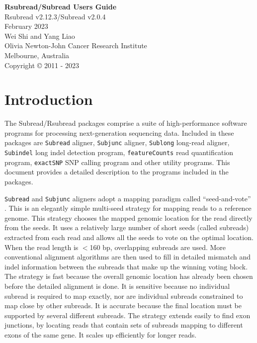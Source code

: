 \documentclass[12pt]{report}
\newcommand{\code}[1]{{\small\texttt{#1}}}
\begin{document}
\begin{titlepage}

\begin{center}
{\Huge\bf Rsubread/Subread Users Guide}\\
\vspace{1 cm}
{\centering\large Rsubread v2.12.3/Subread v2.0.4\\}
\vspace{1 cm}
 February 2023\\
\vspace{5 cm}
\Large Wei Shi and Yang Liao\\
\vspace{1 cm}
\small
{\large Olivia Newton-John Cancer Research Institute\\
Melbourne, Australia\\}
\vspace{7 cm}
\centering Copyright \small{\copyright}  2011 - 2023\\
\end{center}

\end{titlepage}

\tableofcontents

\chapter{Introduction}

The Subread/Rsubread packages comprise a suite of high-performance software programs for processing next-generation sequencing data.
Included in these packages are \code{Subread} aligner, \code{Subjunc} aligner, \code{Sublong} long-read aligner, \code{Subindel} long indel detection program, \code{featureCounts} read quantification program, \code{exactSNP} SNP calling program and other utility programs.
This document provides a detailed description to the programs included in the packages.

\code{Subread} and \code{Subjunc} aligners adopt a mapping paradigm called ``seed-and-vote'' \cite{liao}.
This is an elegantly simple multi-seed strategy for mapping reads to a reference genome. 
This strategy chooses the mapped genomic location for the read directly from the seeds.
It uses a relatively large number of short seeds (called subreads) extracted from each read and allows all the seeds to vote on the optimal location.
When the read length is $<$160 bp, overlapping subreads are used.
More conventional alignment algorithms are then used to fill in detailed mismatch and indel information between the subreads that make up the winning voting block.
The strategy is fast because the overall genomic location has already been chosen before the detailed alignment is done.
It is sensitive because no individual subread is required to map exactly, nor are individual subreads constrained to map close by other subreads.
It is accurate because the final location must be supported by several different subreads. The strategy extends easily to find exon junctions, by locating reads that contain sets of subreads mapping to different exons of the same gene.
It scales up efficiently for longer reads.
\end{document}
